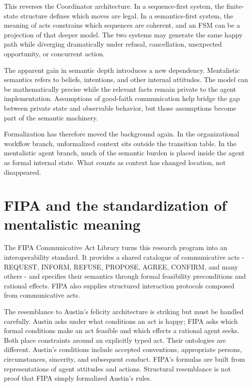 \documentclass[11pt]{article}
\begin{document}
This reverses the Coordinator architecture. In a sequence-first system, the finite-state structure defines which moves are legal. In a semantics-first system, the meaning of acts constrains which sequences are coherent, and an FSM can be a projection of that deeper model. The two systems may generate the same happy path while diverging dramatically under refusal, cancellation, unexpected opportunity, or concurrent action.

The apparent gain in semantic depth introduces a new dependency. Mentalistic semantics refers to beliefs, intentions, and other internal attitudes. The model can be mathematically precise while the relevant facts remain private to the agent implementation. Assumptions of good-faith communication help bridge the gap between private state and observable behavior, but those assumptions become part of the semantic machinery. \cite{smithcohen1996semantics,shoham1993aop}

Formalization has therefore moved the background again. In the organizational workflow branch, unformalized context sits outside the transition table. In the mentalistic agent branch, much of the semantic burden is placed inside the agent as formal internal state. What counts as context has changed location, not disappeared.

\section{FIPA and the standardization of mentalistic meaning}
The FIPA Communicative Act Library turns this research program into an interoperability standard. It provides a shared catalogue of communicative acts - REQUEST, INFORM, REFUSE, PROPOSE, AGREE, CONFIRM, and many others - and specifies their semantics through formal feasibility preconditions and rational effects. FIPA also supplies structured interaction protocols composed from communicative acts. \cite{fipa2002cal}

The resemblance to Austin's felicity architecture is striking but must be handled carefully. Austin asks under what conditions an act is happy; FIPA asks which formal conditions make an act feasible and which effects a rational agent seeks. Both place constraints around an explicitly typed act. Their ontologies are different. Austin's conditions include accepted conventions, appropriate persons, circumstances, sincerity, and subsequent conduct. FIPA's formulas are built from representations of agent attitudes and actions. Structural resemblance is not proof that FIPA simply formalized Austin's rules.
\end{document}
